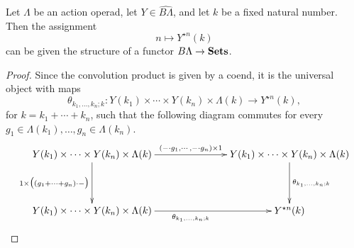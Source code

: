 \begin{lem}\label{lem:calclem2}
Let $\Lambda$ be an action operad, let $Y \in \widehat{B\Lambda}$, and let $k$ be a fixed natural number. Then the assignment
  \[
    n \mapsto Y^{\star n}(k)
  \]
can be given the structure of a functor $B\Lambda \rightarrow \mathbf{Sets}$.
\end{lem}
\begin{proof}
Since the convolution product is given by a coend, it is the universal object with maps
  \[
    \theta_{k_1, \ldots, k_n; k} \colon Y(k_{1}) \times \cdots \times Y(k_{n}) \times \Lambda(k) \rightarrow Y^{\star n}(k),
  \]
for $k= k_1 + \cdots + k_n$, such that the following diagram commutes for every $g_{1} \in \Lambda(k_{1}), \ldots, g_{n} \in \Lambda(k_{n})$.
  \[
    \xy
      (0,0)*+{Y(k_1) \times \cdots \times Y(k_n)  \times \Lambda(k)}="a";
      (70,0)*+{Y(k_1) \times \cdots \times Y(k_n) \times \Lambda(k)}="b";
      (70,-20)*+{Y^{\star n}(k)}="c";
      (0,-20)*+{Y(k_1) \times \cdots \times Y(k_n)  \times \Lambda(k)}="d";
      {\ar^{(-\cdot g_1, \cdots, -\cdot g_n) \times 1} "a" ; "b"};
      {\ar_{1 \times \big( (g_1 + \cdots + g_n)\cdot -\big)} "a" ; "d"};
      {\ar^{\theta_{k_1, \ldots, k_n; k}} "b" ; "c"};
      {\ar_{\theta_{k_1, \ldots, k_n; k}} "d" ; "c"};
    \endxy
  \]
%


\end{proof}
